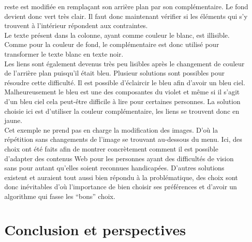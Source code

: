 \documentclass[french,a4paper]{report}
\begin{document}
{reste est modifiée en remplaçant son arrière plan par son complémentaire. Le
fond devient donc vert très clair. Il faut donc maintenant vérifier si les
éléments qui s'y trouvent à l'intérieur répondent aux
contraintes.\\
Le texte présent dans la colonne, ayant comme couleur le blanc, est
illisible. Comme pour la
couleur de fond, le complémentaire est donc utilisé pour transformer le texte blanc en texte noir.\\
Les liens sont également devenus très peu lisibles après le changement de couleur
de l'arrière plan puisqu'il était bleu. Plusieur solutions sont possibles pour
résoudre cette difficulté. Il est possible d'éclaircir le bleu afin d'avoir un
bleu ciel. Malheureusement le bleu est une des composantes du violet et même si
il s'agit d'un bleu ciel cela peut-être difficile à lire pour certaines
personnes. La solution choisie ici est d'utiliser la
couleur complémentaire, les liens se trouvent donc en jaune.\\
Cet exemple ne prend pas en charge la modification des images. D'où la
répétition sans changements de l'image se trouvant au-dessous du menu. Ici,
des choix ont été faits afin de montrer concrètement comment il est possible
d'adapter des contenus Web pour les personnes ayant des difficultés de vision
sans pour autant qu'elles soient reconnues handicapées. D'autres solutions existent
et auraient tout aussi bien répondu à la problématique, des choix sont donc
inévitables d'où l'importance de bien choisir ses préférences et d'avoir un
algorithme qui fasse les \enquote{bons} choix.
\chapter{Conclusion et perspectives}
\label{chpconclusion}
}
\end{document}

